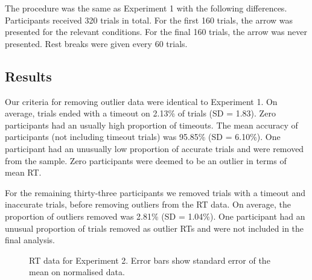 \documentclass[
  man,
  floatsintext,
  longtable,
  nolmodern,
  notxfonts,
  notimes,
  colorlinks=true,linkcolor=blue,citecolor=blue,urlcolor=blue]{apa7}
\begin{document}
The procedure was the same as Experiment 1 with the following
differences. Participants received 320 trials in total. For the first
160 trials, the arrow was presented for the relevant conditions. For the
final 160 trials, the arrow was never presented. Rest breaks were given
every 60 trials.

\subsection{Results}\label{results-1}

Our criteria for removing outlier data were identical to Experiment 1.
On average, trials ended with a timeout on 2.13\% of trials (SD = 1.83).
Zero participants had an usually high proportion of timeouts. The mean
accuracy of participants (not including timeout trials) was 95.85\% (SD
= 6.10\%). One participant had an unusually low proportion of accurate
trials and were removed from the sample. Zero participants were deemed
to be an outlier in terms of mean RT.

For the remaining thirty-three participants we removed trials with a
timeout and inaccurate trials, before removing outliers from the RT
data. On average, the proportion of outliers removed was 2.81\% (SD =
1.04\%). One participant had an unusual proportion of trials removed as
outlier RTs and were not included in the final analysis.

\begin{figure}[H]

\caption{\label{fig-RT-exp2}RT data for Experiment 2. Error bars show
standard error of the mean on normalised data.}


\end{figure}%
\end{document}
